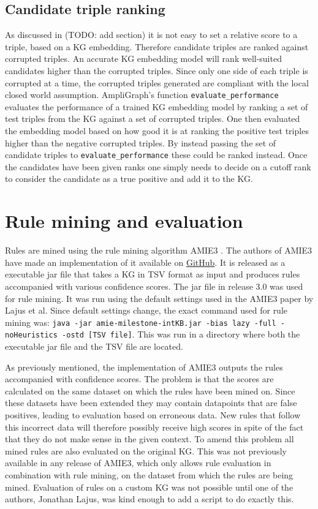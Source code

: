 \subsection{Candidate triple ranking}
As discussed in (TODO: add section) it is not easy to set a relative score to a triple, based on a KG embedding. Therefore candidate triples are ranked against corrupted triples. An accurate KG embedding model will rank well-suited candidates higher than the corrupted triples. Since only one side of each triple is corrupted at a time, the corrupted triples generated are compliant with the local closed world assumption. AmpliGraph's function \texttt{evaluate\_performance} evaluates the performance of a trained KG embedding model by ranking a set of test triples from the KG against a set of corrupted triples. One then evaluated the embedding model based on how good it is at ranking the positive test triples higher than the negative corrupted triples. By instead passing the set of candidate triples to \texttt{evaluate\_performance} these could be ranked instead. Once the candidates have been given ranks one simply needs to decide on a cutoff rank to consider the candidate as a true positive and add it to the KG.


\section{Rule mining and evaluation}
Rules are mined using the rule mining algorithm AMIE3 \cite{amie3}. The authors of AMIE3 have made an implementation of it available on \hyperlink{https://github.com/lajus/amie}{GitHub}. It is released as a executable jar file that takes a KG in TSV format as input and produces rules accompanied with various confidence scores. The jar file in release 3.0 was used for rule mining. It was run using the default settings used in the AMIE3 paper by Lajus et al\cite{amie3}. Since default settings change, the exact command used for rule mining was: \texttt{java -jar amie-milestone-intKB.jar -bias lazy -full -noHeuristics -ostd [TSV file]}. This was run in a directory where both the executable jar file and the TSV file are located.

As previously mentioned, the implementation of AMIE3 outputs the rules accompanied with confidence scores. The problem is that the scores are calculated on the same dataset on which the rules have been mined on. Since these datasets have been extended they may contain datapoints that are false positives, leading to evaluation based on erroneous data. New rules that follow this incorrect data will therefore possibly receive high scores in spite of the fact that they do not make sense in the given context. To amend this problem all mined rules are also evaluated on the original KG. This was not previously available in any release of AMIE3, which only allows rule evaluation in combination with rule mining, on the dataset from which the rules are being mined. Evaluation of rules on a custom KG was not possible until one of the authors, Jonathan Lajus, was kind enough to add a script to do exactly this.

